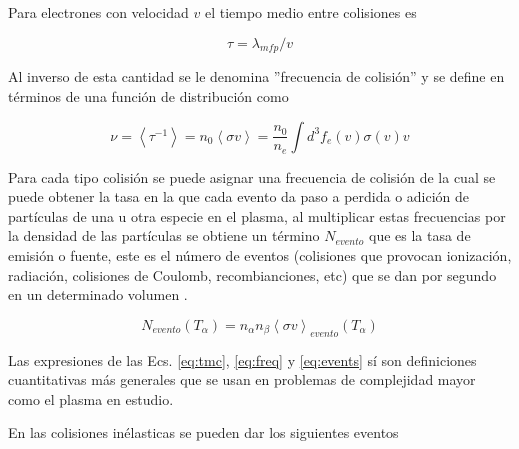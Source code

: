 \documentclass[11pt]{article}
\theoremstyle{definition}
\begin{document}
  Para electrones con velocidad $v$ el tiempo medio entre colisiones es

  \begin{equation}\label{eq:tmc}
    \tau = \lambda_{mfp}/v
  \end{equation}

  Al inverso de esta cantidad se le denomina ''frecuencia de colisi\'on'' y se define en t\'erminos de una funci\'on de distribuci\'on como
  
  \begin{equation}\label{eq:freq}
    \nu = \left<\tau^{-1}\right> = n_0\left<\sigma v\right> = \frac{n_0}{n_e}\int d^3 f_e(v)\sigma(v)v
  \end{equation}

  Para cada tipo colisi\'on se puede asignar una frecuencia de colisi\'on de la cual se puede obtener la tasa en la que cada evento da paso a perdida o adici\'on de part\'iculas de una u otra especie en el plasma, al multiplicar estas frecuencias por la densidad de las part\'iculas se obtiene un t\'ermino $N_{evento}$ que es la tasa de emisi\'on o fuente, este es el n\'umero de eventos (colisiones que provocan ionizaci\'on, radiaci\'on, colisiones de Coulomb, recombianciones, etc) que se dan por segundo en un determinado volumen \cite{lechte2002}.

  \begin{equation}\label{eq:events}
    N_{evento}(T_\alpha) = n_\alpha n_\beta\left<\sigma v\right>_{evento}(T_\alpha) 
  \end{equation}

  Las expresiones de las Ecs. \eqref{eq:tmc}, \eqref{eq:freq} y \eqref{eq:events} s\'i son definiciones cuantitativas m\'as generales que se usan en problemas de complejidad mayor como el plasma en estudio.

  En las colisiones in\'elasticas se pueden dar los siguientes eventos
\end{document}
